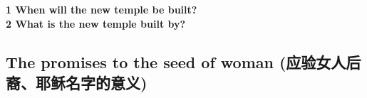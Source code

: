 \textbf{1 When will the new temple be built?}\\
\textbf{2 What is the new temple built by?}\\

\subsection{The promises to the seed of woman (应验女人后裔、耶稣名字的意义)}


